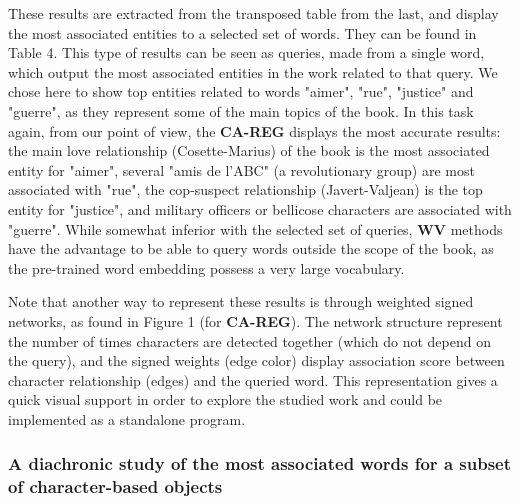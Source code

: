 \documentclass[
twocolumn,
]{ceurart}
\begin{document}
These results are extracted from the transposed table from the last, and display the most associated entities to a selected set of words. They can be found in Table 4. This type of results can be seen as queries, made from a single word, which output the most associated entities in the work related to that query. We chose here to show top entities related to words "aimer", "rue", "justice" and "guerre", as they represent some of the main topics of the book. In this task again, from our point of view, the \textbf{CA-REG} displays the most accurate results: the main love relationship (Cosette-Marius) of the book is the most associated entity for "aimer", several "amis de l'ABC" (a revolutionary group) are most associated with "rue", the cop-suspect relationship (Javert-Valjean) is the top entity for "justice", and military officers or bellicose characters are associated with "guerre". While somewhat inferior with the selected set of queries, \textbf{WV} methods have the advantage to be able to query words outside the scope of the book, as the pre-trained word embedding possess a very large vocabulary.

Note that another way to represent these results is through weighted signed networks, as found in Figure 1 (for \textbf{CA-REG}). The network structure represent the number of times characters are detected together (which do not depend on the query), and the signed weights (edge color) display association score between character relationship (edges) and the queried word. This representation gives a quick visual support in order to explore the studied work and could be implemented as a standalone program.


\subsubsection{A diachronic study of the most associated words for a subset of character-based objects}
\label{diachronic}
\end{document}
